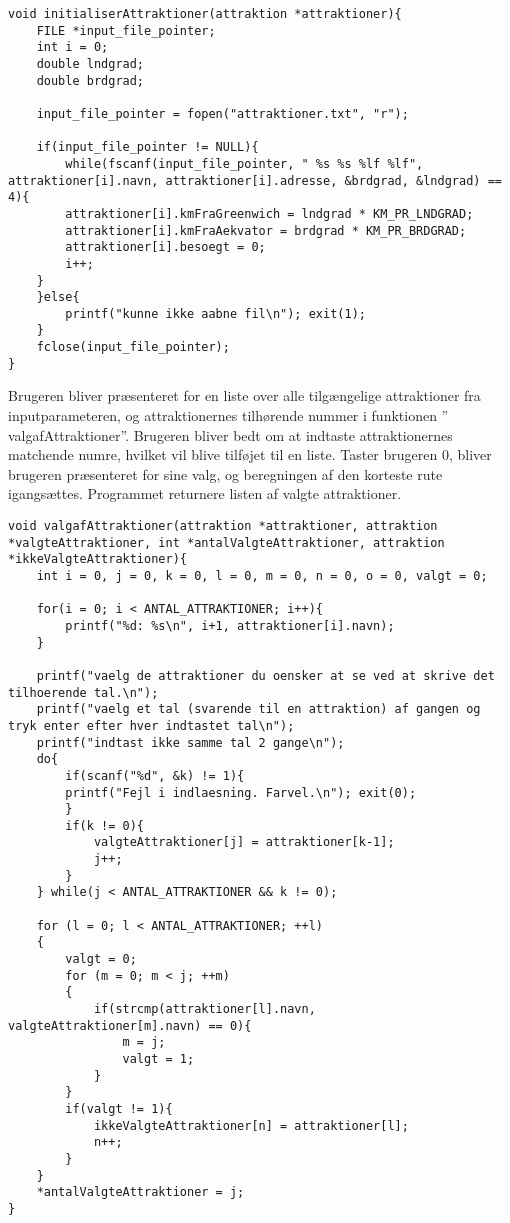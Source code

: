 \begin{lstlisting}
void initialiserAttraktioner(attraktion *attraktioner){
	FILE *input_file_pointer;
	int i = 0;
	double lndgrad;
	double brdgrad;
	
	input_file_pointer = fopen("attraktioner.txt", "r");
	
	if(input_file_pointer != NULL){
		while(fscanf(input_file_pointer, " %s %s %lf %lf", attraktioner[i].navn, attraktioner[i].adresse, &brdgrad, &lndgrad) == 4){
		attraktioner[i].kmFraGreenwich = lndgrad * KM_PR_LNDGRAD;
		attraktioner[i].kmFraAekvator = brdgrad * KM_PR_BRDGRAD;
		attraktioner[i].besoegt = 0;
		i++;
	}
	}else{
		printf("kunne ikke aabne fil\n"); exit(1);
	}
	fclose(input_file_pointer);
} 
\end{lstlisting}

Brugeren bliver præsenteret for en liste over alle tilgængelige attraktioner fra inputparameteren, og attraktionernes tilhørende nummer i funktionen ” valgafAttraktioner”. Brugeren bliver bedt om at indtaste attraktionernes matchende numre, hvilket vil blive tilføjet til en liste. Taster brugeren 0, bliver brugeren præsenteret for sine valg, og beregningen af den korteste rute igangsættes. Programmet returnere listen af valgte attraktioner.

\begin{lstlisting}
void valgafAttraktioner(attraktion *attraktioner, attraktion *valgteAttraktioner, int *antalValgteAttraktioner, attraktion *ikkeValgteAttraktioner){
	int i = 0, j = 0, k = 0, l = 0, m = 0, n = 0, o = 0, valgt = 0;
	
	for(i = 0; i < ANTAL_ATTRAKTIONER; i++){
		printf("%d: %s\n", i+1, attraktioner[i].navn);
	}
	
	printf("vaelg de attraktioner du oensker at se ved at skrive det tilhoerende tal.\n");
	printf("vaelg et tal (svarende til en attraktion) af gangen og tryk enter efter hver indtastet tal\n");
	printf("indtast ikke samme tal 2 gange\n");
	do{
		if(scanf("%d", &k) != 1){
		printf("Fejl i indlaesning. Farvel.\n"); exit(0);
		}
		if(k != 0){
			valgteAttraktioner[j] = attraktioner[k-1];
			j++;
		}
	} while(j < ANTAL_ATTRAKTIONER && k != 0);
	
	for (l = 0; l < ANTAL_ATTRAKTIONER; ++l)
	{
		valgt = 0;
		for (m = 0; m < j; ++m)
		{
			if(strcmp(attraktioner[l].navn, valgteAttraktioner[m].navn) == 0){
				m = j;
				valgt = 1;
			}	
		}
		if(valgt != 1){
			ikkeValgteAttraktioner[n] = attraktioner[l];
			n++;
		}
	}
	*antalValgteAttraktioner = j;
}
\end{lstlisting}
	
